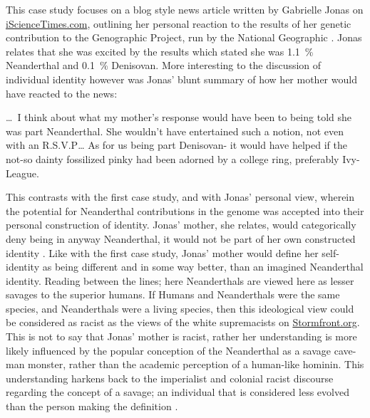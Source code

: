 
This case study focuses on a blog style news article written by Gabrielle Jonas on \href{www.iScienceTimes.com}{iScienceTimes.com}, outlining her personal reaction to the results of her genetic contribution to the Genographic Project, run by the National Geographic \parencite{Jonas_2014}. Jonas relates that she was excited by the results which stated she was \SI{1.1}{\percent} Neanderthal and \SI{0.1}{\percent} Denisovan. 
More interesting to the discussion of individual identity however was Jonas’ blunt summary of how her mother would have reacted to the news:

\begin{aquote}{\cite{Jonas_2014}}
\ldots\ I think about what my mother’s response would have been to being told she was part Neanderthal. She wouldn’t have entertained such a notion, not even with an R.S.V.P… As for us being part Denisovan- it would have helped if the not-so dainty fossilized pinky had been adorned by a college ring, preferably Ivy-League.
\end{aquote}
This contrasts with the first case study, and with Jonas’ personal view, wherein the potential for Neanderthal contributions in the genome was accepted into their personal construction of identity. Jonas’ mother, she relates, would categorically deny being in anyway Neanderthal, it would not be part of her own constructed identity \parencite{Jonas_2014}. Like with the first case study, Jonas’ mother would define her self-identity as being different and in some way better, than an imagined Neanderthal identity. Reading between the lines; here Neanderthals are viewed here as lesser savages to the superior humans. If Humans and Neanderthals were the same species, and Neanderthals were a living species, then this ideological view could be considered as racist as the views of the white supremacists on \url{Stormfront.org}. This is not to say that Jonas’ mother is racist, rather her understanding is more likely influenced by the popular conception of the Neanderthal as a savage cave-man monster, rather than the academic perception of a human-like hominin. This understanding harkens back to the imperialist and colonial racist discourse regarding the concept of a savage; an individual that is considered less evolved than the person making the definition \parencite{Ellingson_2001}.  

